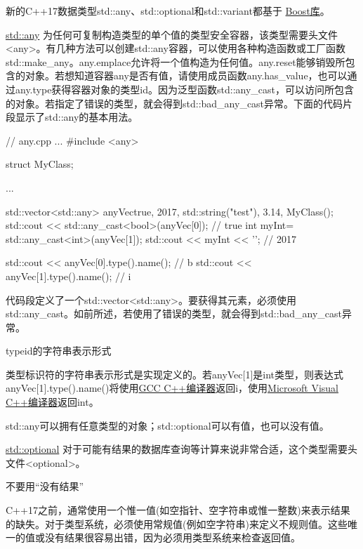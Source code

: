 新的C++17数据类型std::any、std::optional和std::variant都基于 \href{http://www.boost.org/}{Boost库}。


\href{http://en.cppreference.com/w/cpp/utility/any}{std::any} 为任何可复制构造类型的单个值的类型安全容器，该类型需要头文件<any>。有几种方法可以创建std::any容器，可以使用各种构造函数或工厂函数std::make\_any。any.emplace允许将一个值构造为任何值。any.reset能够销毁所包含的对象。若想知道容器any是否有值，请使用成员函数any.has\_value，也可以通过any.type获得容器对象的类型id。因为泛型函数std::any\_cast，可以访问所包含的对象。若指定了错误的类型，就会得到std::bad\_any\_cast异常。下面的代码片段显示了std::any的基本用法。


\begin{cpp}
// any.cpp
...
#include <any>

struct MyClass{};

...

std::vector<std::any> anyVec{true, 2017, std::string("test"), 3.14, MyClass()};
std::cout << std::any_cast<bool>(anyVec[0]); // true
int myInt= std::any_cast<int>(anyVec[1]);
std::cout << myInt << '\n'; // 2017

std::cout << anyVec[0].type().name(); // b
std::cout << anyVec[1].type().name(); // i
\end{cpp}

代码段定义了一个std::vector<std::any>。要获得其元素，必须使用std::any\_cast。如前所述，若使用了错误的类型，就会得到std::bad\_any\_cast异常。

\begin{myNotic}{typeid的字符串表示形式}
	
类型标识符的字符串表示形式是实现定义的。若anyVec[1]是int类型，则表达式anyVec[1].type().name()将使用\href{https://gcc.gnu.org/}{GCC C++编译器}返回i，使用\href{https://en.wikipedia.org/wiki/Microsoft_Visual_C%2B%2B}{Microsoft Visual C++编译器}返回int。

\end{myNotic}

std::any可以拥有任意类型的对象；std::optional可以有值，也可以没有值。


\href{http://en.cppreference.com/w/cpp/utility/optional}{std::optional} 对于可能有结果的数据库查询等计算来说非常合适，这个类型需要头文件<optional>。

\begin{myTip}{不要用“没有结果”}
	
C++17之前，通常使用一个惟一值(如空指针、空字符串或惟一整数)来表示结果的缺失。对于类型系统，必须使用常规值(例如空字符串)来定义不规则值。这些唯一的值或没有结果很容易出错，因为必须用类型系统来检查返回值。
	
\end{myTip}

